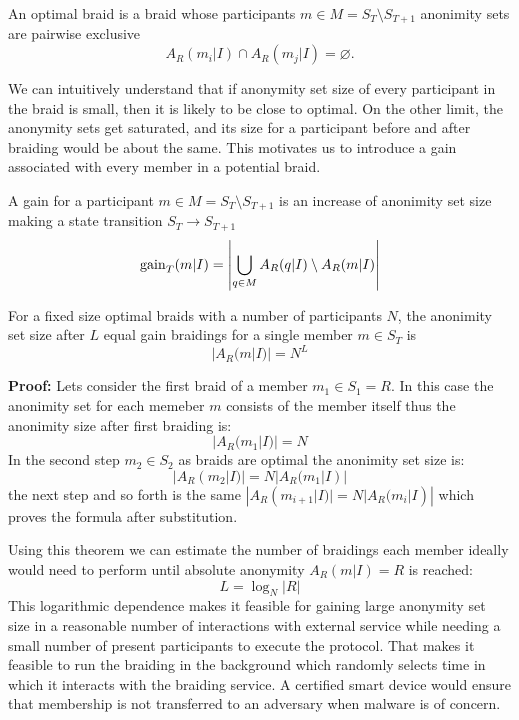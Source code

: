 \documentclass[12pt]{article}
\newenvironment{theorem}[2][Theorem]{\begin{trivlist}
\item[\hskip \labelsep {\bfseries #1}\hskip \labelsep {\bfseries #2.}]}{\end{trivlist}}
\newenvironment{definition}[2][Definition]{\begin{trivlist}
\item[\hskip \labelsep {\bfseries #1}\hskip \labelsep {\bfseries #2.}]}{\end{trivlist}}
\begin{document}
\begin{definition}{(optimal braid)}
  An optimal braid is a braid whose participants $m \in M = S_T \setminus S_{T+1}$ anonimity sets are pairwise exclusive
  \begin{equation}
    A_R(m_i|I) \cap A_R(m_j|I) = \varnothing.
  \end{equation}
\end{definition}

We can intuitively understand that if anonymity set size of every participant in the braid is small, then it is likely to be close to optimal. On the other limit, the anonymity sets get saturated, and its size for a participant before and after braiding would be about the same. This motivates us to introduce a gain associated with every member in a potential braid.

\begin{definition}{(gain)}
  A gain for a participant $m \in M = S_T \setminus S_{T+1}$ is an increase of anonimity set size making a state transition $S_T \to S_{T+1}$
  \begin{equation}
    {\rm gain}_T(m | I) = \left|\bigcup_{q \in M} A_R (q| I)  \setminus A_R(m | I) \right| 
  \end{equation}
\end{definition}

\begin{theorem}{(optimal gain)}
  For a fixed size optimal braids with a number of participants $N$, the anonimity set size after $L$ equal gain braidings for a single member $m \in S_T$ is
  \begin{equation}
    |A_R(m|I)|  = N^L
  \end{equation}

  {\bf Proof:} Lets consider the first braid of a member $m_1 \in S_1 = R$. In this case the anonimity set for each memeber $m$ consists of the member itself thus the anonimity size after first braiding is:
  \begin{equation}
    |A_R(m_1|I)| = N
  \end{equation}
  In the second step $m_2 \in S_2$ as braids are optimal the anonimity set size is:
  \begin{equation}
    |A_R(m_2|I)| = N |A_R(m_1|I)|
  \end{equation}
  the next step and so forth is the same $|A_R(m_{i+1}|I)| = N |A_R(m_i|I)|$ which proves the formula after substitution.
\end{theorem}

Using this theorem we can estimate the number of braidings each member ideally would need to perform until absolute anonymity $A_R(m|I) = R$ is reached:
\begin{equation}
  L = \log_N |R| \label{eq:2}
\end{equation}
This logarithmic dependence makes it feasible for gaining large anonymity set size in a reasonable number of interactions with external service while needing a small number of present participants to execute the protocol. That makes it feasible to run the braiding in the background which randomly selects time in which it interacts with the braiding service. A certified smart device would ensure that membership is not transferred to an adversary when malware is of concern.
\end{document}
